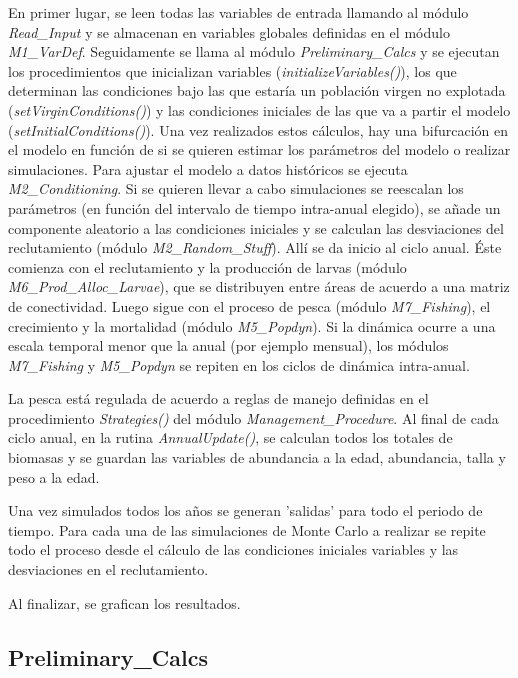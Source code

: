 \documentclass[12pt, oneside, a4paper]{article}
\begin{document}
		En primer lugar, se leen todas las variables de entrada llamando al módulo \emph{Read\_Input} y se almacenan en variables globales definidas en el módulo \emph{M1\_VarDef}. 
		Seguidamente se llama al módulo \emph{Preliminary\_Calcs} y se ejecutan los procedimientos que inicializan variables (\emph{initializeVariables()}), los que determinan las condiciones bajo las que estaría un población virgen no explotada (\emph{setVirginConditions()}) y las condiciones iniciales de las que va a partir el modelo (\emph{setInitialConditions()}). 
		Una vez realizados estos cálculos, hay una bifurcación en el modelo en función de si se quieren estimar los parámetros del modelo o realizar simulaciones. 
		Para ajustar el modelo a datos históricos se ejecuta \emph{M2\_Conditioning}. 
		Si se quieren llevar a cabo simulaciones se reescalan los parámetros (en función del intervalo de tiempo intra-anual elegido), se añade un componente aleatorio a las condiciones iniciales y se calculan las desviaciones del reclutamiento (módulo \emph{M2\_Random\_Stuff}). Allí se da inicio al ciclo anual. Éste comienza con el reclutamiento y la producción de larvas (módulo \emph{M6\_Prod\_Alloc\_Larvae}), que se distribuyen entre áreas de acuerdo a una matriz de conectividad. Luego sigue con el proceso de pesca (módulo \emph{M7\_Fishing}), el crecimiento y la mortalidad (módulo \emph{M5\_Popdyn}). Si la dinámica ocurre a una escala temporal menor que la anual (por ejemplo mensual), los módulos \emph{M7\_Fishing} y \emph{M5\_Popdyn} se repiten en los ciclos de dinámica intra-anual. 
		\par La pesca está regulada de acuerdo a reglas de manejo definidas en el procedimiento \emph{Strategies()} del módulo \emph{Management\_Procedure}.   
		Al final de cada ciclo anual, en la rutina \emph{AnnualUpdate()}, se calculan todos los totales de biomasas y se guardan las variables de abundancia a la edad, abundancia, talla y peso a la edad. 

		Una vez simulados todos los años se generan 'salidas' para todo el periodo de tiempo.
		Para cada una de las simulaciones de Monte Carlo a realizar se repite todo el proceso desde el cálculo de las condiciones iniciales variables y las desviaciones en el reclutamiento. 

		Al finalizar, se grafican los resultados.
		
		\subsection{Preliminary\_Calcs}
\end{document}
